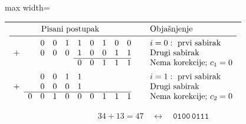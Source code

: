 \documentclass[a4paper,11pt]{article}
\numberwithin{equation}{section}
\renewcommand{\arraystretch}{1.25}
\begin{document}
\begin{center}\begin{minipage}{\linewidth}\centering\captionsetup{hypcap=false}
\label{tab:zbir-1}
\begingroup\small\setlength{\arraycolsep}{2pt}\renewcommand{\arraystretch}{1.12}
\begin{adjustbox}{max width=\linewidth}\begin{tabular}{@{}c@{}}\toprule
$\begin{array}{r*{9}{c}@{}c@{}l}
\multicolumn{10}{c}{\text{Pisani postupak}} & \rule{8mm}{0pt} & \text{Objašnjenje}\\\midrule
 &  & 0 & 0 & 1 & 1 & 0 & 1 & 0 & 0 & & i=0:\ \text{prvi sabirak} \\
+ &  & 0 & 0 & 0 & 1 & 0 & 0 & 1 & 1 & & \text{Drugi sabirak} \\
\cline{6-10}
 &  &  &  &  & 0 & 0 & 1 & 1 & 1 & & \text{Nema korekcije; }c_1=0 \\
\noalign{\vskip 5pt}
 &  & 0 & 0 & 1 & 1 &  &  &  &  & & i=1:\ \text{prvi sabirak} \\
+ &  & 0 & 0 & 0 & 1 &  &  &  &  & & \text{Drugi sabirak} \\
\cline{2-10}
 & 0 & 0 & 1 & 0 & 0 & 0 & 1 & 1 & 1 & & \text{Nema korekcije; }c_2=0 \\
\end{array}$\\\bottomrule\end{tabular}
\end{adjustbox}\endgroup
\begin{equation}\label{eq:bcd-zbir-1}
34+13=47\quad\longleftrightarrow\quad \mathtt{0100\,0111}
\end{equation}
\end{minipage}\end{center}
\end{document}
